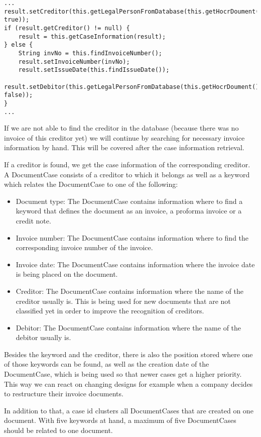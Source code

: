 \begin{lstlisting}
...
result.setCreditor(this.getLegalPersonFromDatabase(this.getHocrDoument(), true));
if (result.getCreditor() != null) {
    result = this.getCaseInformation(result);
} else {
    String invNo = this.findInvoiceNumber();
    result.setInvoiceNumber(invNo);
    result.setIssueDate(this.findIssueDate());
    result.setDebitor(this.getLegalPersonFromDatabase(this.getHocrDoument(), false));
}
...
\end{lstlisting}

If we are not able to find the creditor in the database (because there was no invoice of this creditor yet) we will continue by searching for necessary invoice information by hand. This will be covered after the case information retrieval.

If a creditor is found, we get the case information of the corresponding creditor. A DocumentCase consists of a creditor to which it belongs as well as a keyword which relates the DocumentCase to one of the following:
\begin{itemize}
	\item Document type: The DocumentCase contains information where to find a keyword that defines the document as an invoice, a proforma invoice or a credit note.
	\item Invoice number: The DocumentCase contains information where to find the corresponding invoice number of the invoice.
	\item Invoice date: The DocumentCase contains information where the invoice date is being placed on the document.
	\item Creditor: The DocumentCase contains information where the name of the creditor usually is. This is being used for new documents that are not classified yet in order to improve the recognition of creditors.
	\item Debitor: The DocumentCase contains information where the name of the debitor usually is.
\end{itemize}

Besides the keyword and the creditor, there is also the position stored where one of those keywords can be found, as well as the creation date of the DocumentCase, which is being used so that newer cases get a higher priority. This way we can react on changing designs for example when a company decides to restructure their invoice documents.

In addition to that, a case id clusters all DocumentCases that are created on one document. With five keywords at hand, a maximum of five DocumentCases should be related to one document.

